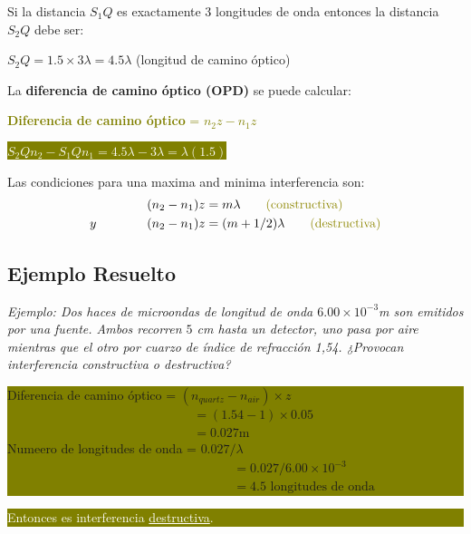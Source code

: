 \documentclass[12pt]{article}
\begin{document}
	\vspace{0.5cm}
	Si la distancia $S_1Q$ es exactamente 3 longitudes de onda entonces la distancia $S_2Q$ debe ser:
	
	$S_2Q = 1.5 \times 3\lambda = 4.5 \lambda$ (longitud de camino óptico)
	
	La \textbf{diferencia de camino óptico (OPD)} se puede calcular:
	
	\textcolor{olive}{\textbf{Diferencia de camino óptico} = $n_2z - n_1z$}
	
	\begin{center}
		\colorbox{olive}{\textcolor{white}{$S_2Q n_2 - S_1Q n_1 = 4.5\lambda - 3\lambda = \lambda(1.5)$}}
	\end{center}
	
	Las condiciones para una maxima and minima interferencia son:
	\begin{align*}
		(n_2 - n_1)z &= m\lambda \qquad \textcolor{olive}{\text{(constructiva)}} \\
		y \qquad \qquad (n_2 - n_1)z &= (m+1/2)\lambda \qquad \textcolor{olive}{\text{(destructiva)}}
	\end{align*}
	
	\subsection{Ejemplo Resuelto}
	\textit{Ejemplo: Dos haces de microondas de longitud de onda $6.00 \times 10^{-3}$m son emitidos por una fuente. Ambos recorren $5$ cm hasta un detector, uno pasa por aire mientras que el otro por cuarzo de índice de refracción 1,54. ¿Provocan interferencia constructiva o destructiva?}
	
	\colorbox{olive}{\parbox{\textwidth}{\color{white}
			Diferencia de camino óptico = $(n_{quartz} - n_{air}) \times z$
			\begin{align*}
				\qquad &= (1.54 - 1) \times 0.05 \\
				\qquad &= 0.027\text{m}
			\end{align*}
			Numeero de longitudes de onda = $0.027 / \lambda$
			\begin{align*}
				\qquad \qquad \qquad \qquad \qquad &= 0.027 / 6.00 \times 10^{-3} \\
				\qquad \qquad \qquad \qquad \qquad &= 4.5 \text{ longitudes de onda}
			\end{align*}
	}}
	\colorbox{olive}{\parbox{\textwidth}{\textcolor{white}{Entonces es interferencia \underline{destructiva}.}}}
	
\end{document}
